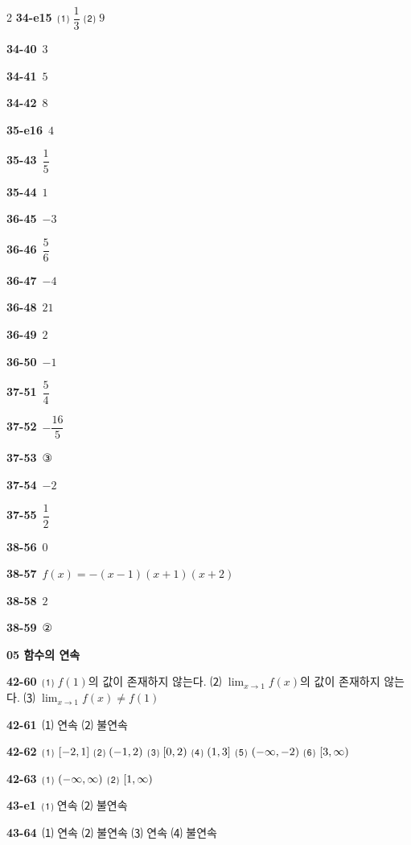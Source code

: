 \documentclass[10pt,a4paper]{article}
\begin{document}
\begin{multicols}{2}
\noindent\textbf{34-e15}\ ⑴ $\dfrac{1}{3}$ ⑵ $9$\par
\noindent\textbf{34-40}\ $3$\par
\noindent\textbf{34-41}\ $5$\par
\noindent\textbf{34-42}\ $8$\par
\noindent\textbf{35-e16}\ $4$\par
\noindent\textbf{35-43}\ $\dfrac{1}{5}$\par
\noindent\textbf{35-44}\ $1$\par
\noindent\textbf{36-45}\ $-3$\par
\noindent\textbf{36-46}\ $\dfrac{5}{6}$\par
\noindent\textbf{36-47}\ $-4$\par
\noindent\textbf{36-48}\ $21$\par
\noindent\textbf{36-49}\ $2$\par
\noindent\textbf{36-50}\ $-1$\par
\noindent\textbf{37-51}\ $\dfrac{5}{4}$\par
\noindent\textbf{37-52}\ $-\dfrac{16}{5}$\par
\noindent\textbf{37-53}\ ③\par
\noindent\textbf{37-54}\ $-2$\par
\noindent\textbf{37-55}\ $\dfrac{1}{2}$\par
\noindent\textbf{38-56}\ $0$\par
\noindent\textbf{38-57}\ $f(x)=-(x-1)(x+1)(x+2)$\par
\noindent\textbf{38-58}\ $2$\par
\noindent\textbf{38-59}\ ②\par
\noindent\textbf{05 함수의 연속}\par\smallskip
\noindent\textbf{42-60}\ ⑴ $f(1)$의 값이 존재하지 않는다. ⑵ $\displaystyle\lim_{x\to 1}f(x)$의 값이 존재하지 않는다. ⑶ $\displaystyle\lim_{x\to 1}f(x)\ne f(1)$\par
\noindent\textbf{42-61}\ ⑴ 연속 ⑵ 불연속\par
\noindent\textbf{42-62}\ ⑴ $[-2{,}\mkern3mu\mathopen{}1]$ ⑵ $(-1{,}\mkern3mu\mathopen{}2)$ ⑶ $[0{,}\mkern3mu\mathopen{}2)$ ⑷ $(1{,}\mkern3mu\mathopen{}3]$ ⑸ $(-\infty{,}\mkern3mu\mathopen{}-2)$ ⑹ $[3{,}\mkern3mu\mathopen{}\infty)$\par
\noindent\textbf{42-63}\ ⑴ $(-\infty{,}\mkern3mu\mathopen{}\infty)$ ⑵ $[1{,}\mkern3mu\mathopen{}\infty)$\par
\noindent\textbf{43-e1}\ ⑴ 연속 ⑵ 불연속\par
\noindent\textbf{43-64}\ ⑴ 연속 ⑵ 불연속 ⑶ 연속 ⑷ 불연속\par

\end{multicols}
\end{document}
